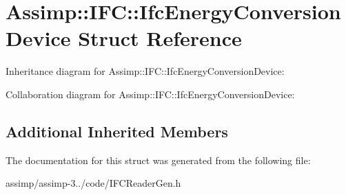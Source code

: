 \hypertarget{struct_assimp_1_1_i_f_c_1_1_ifc_energy_conversion_device}{\section{Assimp\+:\+:I\+F\+C\+:\+:Ifc\+Energy\+Conversion\+Device Struct Reference}
\label{struct_assimp_1_1_i_f_c_1_1_ifc_energy_conversion_device}
}


Inheritance diagram for Assimp\+:\+:I\+F\+C\+:\+:Ifc\+Energy\+Conversion\+Device\+:


Collaboration diagram for Assimp\+:\+:I\+F\+C\+:\+:Ifc\+Energy\+Conversion\+Device\+:
\subsection*{Additional Inherited Members}


The documentation for this struct was generated from the following file\+:\begin{DoxyCompactItemize}
\item 
assimp/assimp-\/3../code/I\+F\+C\+Reader\+Gen.\+h\end{DoxyCompactItemize}

